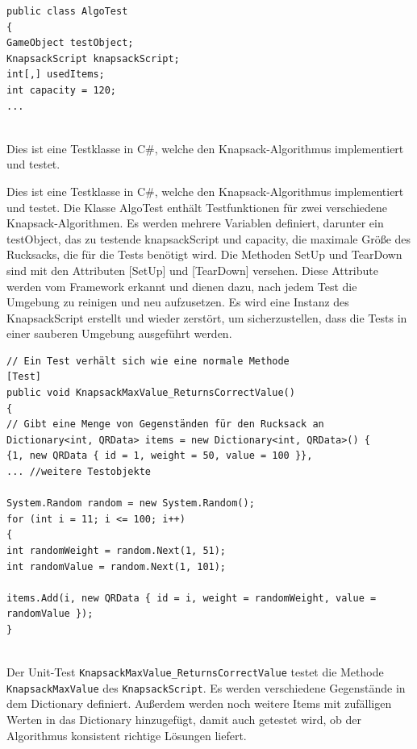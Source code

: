 \begin{lstlisting}[style=csharp, caption={Unit Test Klasse}, label=code:UnitTest]
public class AlgoTest
{
GameObject testObject;
KnapsackScript knapsackScript;
int[,] usedItems;
int capacity = 120;
...
\end{lstlisting}\\

Dies ist eine Testklasse in C#, welche den Knapsack-Algorithmus implementiert und testet.

Dies ist eine Testklasse in C#, welche den Knapsack-Algorithmus implementiert und testet. Die Klasse AlgoTest enthält
Testfunktionen für zwei verschiedene Knapsack-Algorithmen. Es werden mehrere Variablen definiert, darunter ein testObject,
das zu testende knapsackScript und capacity, die maximale Größe des Rucksacks, die für die Tests benötigt wird. Die Methoden
SetUp und TearDown sind mit den Attributen [SetUp] und [TearDown] versehen. Diese Attribute werden vom Framework erkannt
und dienen dazu, nach jedem Test die Umgebung zu reinigen und neu aufzusetzen. Es wird eine Instanz des KnapsackScript
erstellt und wieder zerstört, um sicherzustellen, dass die Tests in einer sauberen Umgebung ausgeführt werden.

\begin{lstlisting}[style=csharp, caption={Unit Test Methode}, label=code:Test Methode]
// Ein Test verhält sich wie eine normale Methode
[Test]
public void KnapsackMaxValue_ReturnsCorrectValue()
{
// Gibt eine Menge von Gegenständen für den Rucksack an
Dictionary<int, QRData> items = new Dictionary<int, QRData>() {
{1, new QRData { id = 1, weight = 50, value = 100 }},
... //weitere Testobjekte

System.Random random = new System.Random();
for (int i = 11; i <= 100; i++)
{
int randomWeight = random.Next(1, 51);
int randomValue = random.Next(1, 101);

items.Add(i, new QRData { id = i, weight = randomWeight, value = randomValue });
}
\end{lstlisting}\\

Der Unit-Test \texttt{KnapsackMaxValue_ReturnsCorrectValue} testet die Methode \texttt{KnapsackMaxValue} des
\texttt{KnapsackScript}. Es werden verschiedene Gegenstände in dem Dictionary definiert. Außerdem werden noch weitere Items
mit zufälligen Werten in das Dictionary hinzugefügt, damit auch getestet wird, ob der Algorithmus konsistent richtige Lösungen liefert.

